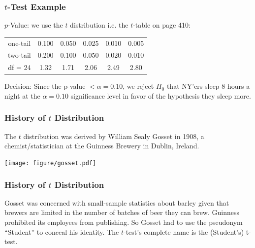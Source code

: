 \documentclass[handout]{beamer}
\newcommand{\blue}[1]{\textcolor{blue2}{#1}}
\begin{document}
\begin{frame}
\frametitle{$t$-Test Example}

$p$-Value: we use the $t$ distribution i.e. the $t$-table on page 410:
\begin{center}
\begin{tabular}{c|ccccc}
\hline
one-tail & 0.100 & 0.050 & 0.025 & 0.010 & 0.005\\
two-tail & 0.200 & 0.100 & 0.050 & 0.020 & 0.010\\
\hline
df = 24 & 1.32 & 1.71 & 2.06 & 2.49 & 2.80\\
\hline
\end{tabular}
\end{center}


\vspace{3cm}

\pause Decision: Since the p-value $< \alpha=0.10$, we reject $H_0$ that NY'ers sleep 8 hours a night at the $\alpha=0.10$ significance level in favor of the hypothesis they sleep more.
\end{frame}


\begin{frame}
\frametitle{History of $t$ Distribution}
The $t$ distribution was derived by William Sealy Gosset in 1908, a chemist/statistician at the Guinness Brewery in Dublin, Ireland.
\begin{center}
\texttt{[image: figure/gosset.pdf]}
\end{center}
\end{frame}


\begin{frame}
\frametitle{History of $t$ Distribution}
Gosset was concerned with \blue{small-sample statistics} about barley given that brewers are limited in the number of batches of beer they can brew.
\pause \vskip 0.5cm
Guinness prohibited its employees from publishing.  So Gosset had to use the pseudonym ``Student'' to conceal his identity.
\pause \vskip 0.5cm
The $t$-test's complete name is the \blue{(Student's) t-test}.  
\end{frame}
\end{document}
